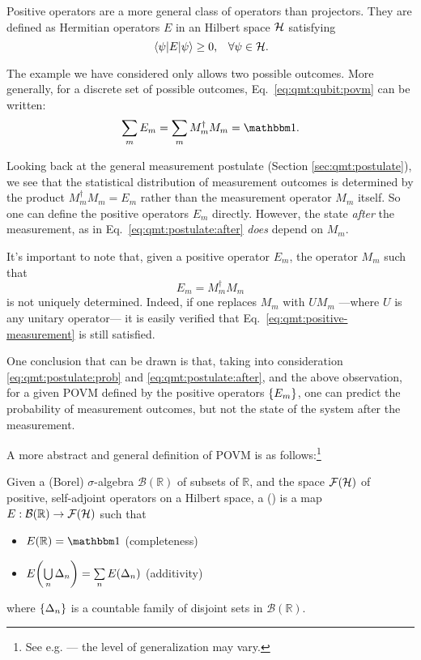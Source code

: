 Positive operators are a more general class of operators than projectors.
They are defined as Hermitian operators $E$ in an Hilbert space $\mathcal{H}$ satisfying
\[
  \ev{E}{\psi} \ge 0 \text{,}\quad \forall \psi \in \hilb{H}.
\]

The example we have considered only allows two possible outcomes.
More generally, for a discrete set of possible outcomes,
Eq.~\eqref{eq:qmt:qubit:povm} can be written:
\begin{equation}
  \sum_m E_m = \sum_m M_m^{\dagger} M_m = \idop \text{.}
\end{equation}

Looking back at the general measurement postulate (Section \ref{sec:qmt:postulate}),
we see that the statistical distribution of measurement outcomes
is determined by the product $M_m^{\dagger} M_m = E_m$ rather than the
measurement operator $M_m$ itself. So one can define the positive operators $E_m$ directly.
However, the state \emph{after} the measurement, as in Eq.~\eqref{eq:qmt:postulate:after}
\emph{does} depend on $M_m$.

It's important to note that, given a positive operator $E_m$, the operator
$M_m$ such that
\begin{equation}\label{eq:qmt:positive-measurement}
  E_m = M_{m}^{\dagger} M_m
\end{equation}
is not uniquely determined.
Indeed, if one replaces $M_m$ with $UM_m$
---where $U$ is any unitary operator---
it is easily verified that
Eq.~\eqref{eq:qmt:positive-measurement} is still satisfied.

One conclusion that can be drawn is that,
taking into consideration \eqref{eq:qmt:postulate:prob} and
\eqref{eq:qmt:postulate:after}, and the above observation,
for a  given POVM defined by the positive operators $\left\{E_m\right\}$,
one can predict the probability of measurement outcomes,
but not the state of the system after the measurement.

A more abstract and general definition of POVM is as
follows:\footnote{
  See e.g. \cite{BeneduciPhD, Berberian} --- the level of generalization may vary.
}
\begin{definition}
  Given a (Borel) $\sigma$-algebra $\mathcal{B}(\mathbb{R})$ of subsets of $\mathbb{R}$,
  and the space $\mathcal{F}(\mathcal{H})$ of positive, self-adjoint operators on a Hilbert space,
  a  ()
  is a map $E: \mathcal{B}(\mathbb{R}) \rightarrow \mathcal{F}(\mathcal{H})$
  such that
  \begin{itemize}
    \item $E(\mathbb{R}) = \idop$ (completeness)
    \item $E\qty(\bigcup\limits_{n} \Delta_n) = \sum\limits_{n} E\qty(\Delta_n)$ (additivity)
  \end{itemize}
  where $\left\{\Delta_n\right\}$ is a countable family of disjoint sets in
  $\mathcal{B}(\mathbb{R})$.
\end{definition}
